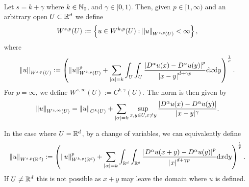 \documentclass[
    a4paper,
    DIV=14,
    abstract=true,
    numbers=noenddot
]{scrartcl}
\begin{document}
\begin{definition}\label{soledkij def}
    Let $s=k+\gamma$ where $k \in \mathbb{N}_0$, and $\gamma \in [0,1)$. Then, given  $p \in [1,\infty)$ and an arbitrary open $U \subset \mathbb{R}^d$ we define
    \begin{align*}
        W^{s ,p}(U):= \left\{u \in W^{k ,p}(U): \left\lVert u \right\rVert_{W^{s,p}(U)}<\infty\right\},
    \end{align*}
    where
    \begin{align}\label{norm def}
        \left\lVert u \right\rVert_{W^{s,p}(U)}:= \left(\left\lVert u \right\rVert_{W^{k,p}(U)}^p+ \sum_{{\left| \alpha \right|}=k }\int_{U}\int_{U}\frac{{\left| D^\alpha u(x)-D^\alpha u(y) \right|}^p}{{\left| x-y \right|}^{d+\gamma p}}\mathrm{d} x \mathrm{d} y\right)^\frac{1}{p}.
    \end{align}
    For $p = \infty$, we define $W^{s,\infty}(U):= C^{k,\gamma}(U)$. The norm is then given by
    \begin{align*}
        \left\lVert u \right\rVert_{W^{s,\infty}(U)}= \left\lVert u \right\rVert_{C^{k}(U)}+ \sum_{{\left| \alpha \right|} =k}  \sup _{x, y \in U, x \neq y} \frac{|D^\alpha u(x)- D^\alpha u(y)|}{|x-y|^\gamma }.
    \end{align*}
\end{definition}
\begin{observation}
    In the case where $U= \mathbb{R}^d$, by a change of variables, we can equivalently define    \begin{align}\label{norm def}
        \left\lVert u \right\rVert_{W^{s,p}(\mathbb{R}^d)}:= \left(\left\lVert u \right\rVert_{W^{k,p}(\mathbb{R}^d)}^p+ \sum_{{\left| \alpha \right|}=k }\int_{\mathbb{R}^d}\int_{\mathbb{R}^d}\frac{{\left| D^\alpha u(x+y)-D^\alpha u(y) \right|}^p}{{\left| x \right|}^{d+\gamma p}}\mathrm{d} x \mathrm{d} y\right)^\frac{1}{p}.
    \end{align}
    If $U \neq \mathbb{R}^d$ this is not possible as $x+y$ may leave the domain where $u$ is defined.
\end{observation}
\end{document}

